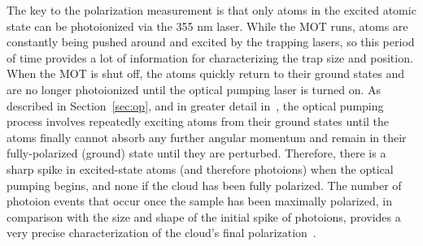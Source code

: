 The key to the polarization measurement is that only atoms in the excited atomic state can be photoionized via the 355 nm laser.  While the MOT runs, atoms are constantly being pushed around and excited by the trapping lasers, so this period of time provides a lot of information for characterizing the trap size and position.  When the MOT is shut off, the atoms quickly return to their ground states and are no longer photoionized until the optical pumping laser is turned on.  As described in Section~\ref{sec:op}, and in greater detail in~\cite{ben_OP}, the optical pumping process involves repeatedly exciting atoms from their ground states until the atoms finally cannot absorb any further angular momentum and remain in their fully-polarized (ground) state until they are perturbed.  Therefore, there is a sharp spike in excited-state atoms (and therefore photoions) when the optical pumping begins, and none if 
the cloud has been fully polarized.  The number of photoion events that occur once the sample has been maximally polarized, in comparison with the size and shape of the initial spike of photoions, provides a very precise characterization of the cloud's final polarization~\cite{ben_OP}.



